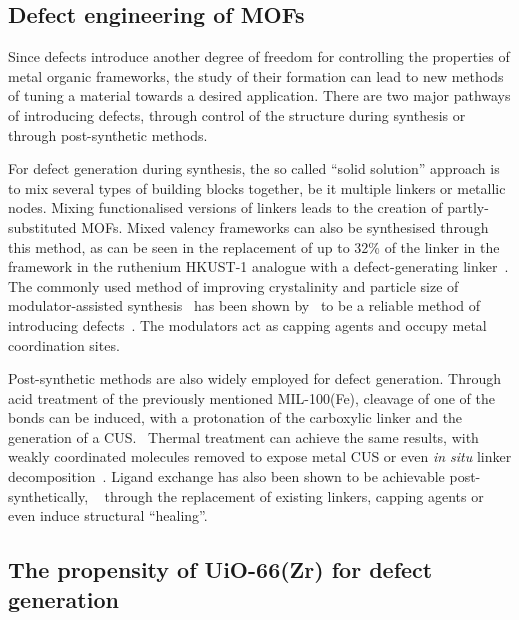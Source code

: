 \subsection{Defect engineering of MOFs}

Since defects introduce another degree of freedom
for controlling the properties of metal organic frameworks, the 
study of their formation can lead to new methods of tuning
a material towards a desired application.
There are two major pathways of introducing defects, through 
control of the structure during synthesis or through post-synthetic 
methods.

For defect generation during synthesis, the so called 
``solid solution'' approach is to mix several types of 
building blocks together, be it multiple linkers or 
metallic nodes. Mixing functionalised versions of linkers
leads to the creation of partly-substituted MOFs.
Mixed valency frameworks can also be synthesised through 
this method, as can be seen in the replacement of up to 32\% of the 
linker in the framework in the ruthenium HKUST-1 
analogue with a defect-generating 
linker~\cite{zhangRutheniumMetalOrganicFrameworks2016}.
The commonly used method of improving crystalinity and 
particle size of modulator-assisted 
synthesis~\cite{schaateModulatedSynthesisZrBased2011} has been shown 
by~\citeauthor{shearerDefectEngineeringTuning2016}
to be a reliable method of introducing 
defects~\cite{shearerDefectEngineeringTuning2016}. 
The modulators act as capping agents and occupy metal coordination sites.

Post-synthetic methods are also widely employed for defect 
generation. Through acid treatment of the previously mentioned 
MIL-100(Fe), cleavage of one of the  bonds can be 
induced, with a protonation of the carboxylic linker and the
generation of a CUS.~\cite{vermoorteleTuningCatalyticPerformance2012}
Thermal treatment can achieve the same results, with weakly coordinated
molecules removed to expose metal CUS or even \textit{in situ}
linker decomposition~\cite{gadipelliPostsynthesisAnnealingMOF52014}.
Ligand exchange has also been shown to be achievable post-synthetically,
~\cite{shearerFunctionalizingDefectsPostsynthetic2016} through the 
replacement of existing linkers, capping agents or even induce
structural ``healing''.

\subsection{The propensity of UiO-66(Zr) for defect generation}

